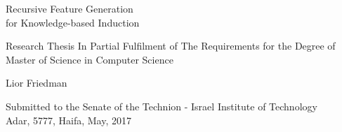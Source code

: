 \documentclass[twoside,11pt]{article}
\theoremstyle{definition}
\begin{document}
	

\thispagestyle{empty}

\begin{center}
{\LARGE Recursive Feature Generation\\ for Knowledge-based Induction}\\[0.2\baselineskip]
\end{center}

\begin{center}
{\large Research Thesis
In Partial Fulfilment of The Requirements for the Degree of
 \\Master of Science in Computer Science}
\end{center}

\vspace*{2\baselineskip}

\begin{center}
{\Large Lior Friedman}
\end{center}

\vspace*{8\baselineskip}


\begin{center}
Submitted to the Senate of the Technion - Israel Institute of Technology\\
Adar, 5777, Haifa, May, 2017
\end{center}

\clearpage
\thispagestyle{empty}
\end{document}
